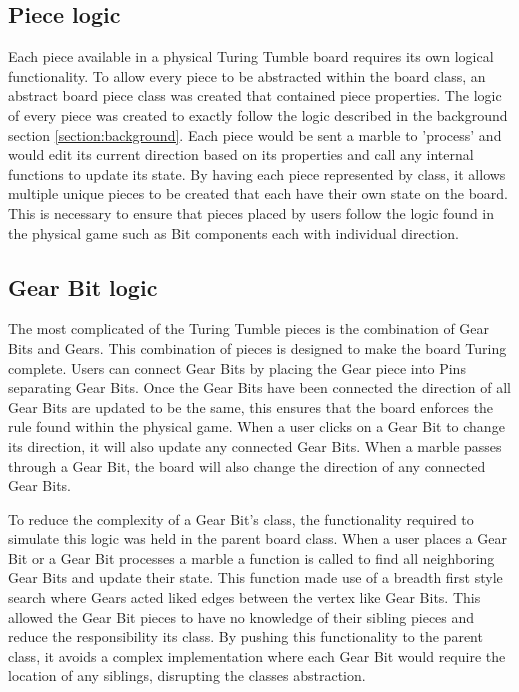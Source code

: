 \documentclass{l4proj}
\begin{document}
\subsection{Piece logic}
Each piece available in a physical Turing Tumble board requires its own logical functionality. To allow every piece to be abstracted within the board class, an abstract board piece class was created that contained piece properties. The logic of every piece was created to exactly follow the logic described in the background section \ref{section:background}. Each piece would be sent a marble to 'process' and would edit its current direction based on its properties and call any internal functions to update its state. By having each piece represented by class, it allows multiple unique pieces to be created that each have their own state on the board. This is necessary to ensure that pieces placed by users follow the logic found in the physical game such as Bit components each with individual direction.  


\subsection{Gear Bit logic}
The most complicated of the Turing Tumble pieces is the combination of Gear Bits and Gears. This combination of pieces is designed to make the board Turing complete. Users can connect Gear Bits by placing the Gear piece into Pins separating Gear Bits. Once the Gear Bits have been connected the direction of all Gear Bits are updated to be the same, this ensures that the board enforces the rule found within the physical game. When a user clicks on a Gear Bit to change its direction, it will also update any connected Gear Bits. When a marble passes through a Gear Bit, the board will also change the direction of any connected Gear Bits.

To reduce the complexity of a Gear Bit's class, the functionality required to simulate this logic was held in the parent board class. When a user places a Gear Bit or a Gear Bit processes a marble a function is called to find all neighboring Gear Bits and update their state. This function made use of a breadth first style search where Gears acted liked edges between the vertex like Gear Bits. This allowed the Gear Bit pieces to have no knowledge of their sibling pieces and reduce the responsibility its class. By pushing this functionality to the parent class, it avoids a complex implementation where each Gear Bit would require the location of any siblings, disrupting the classes abstraction.
\end{document}
